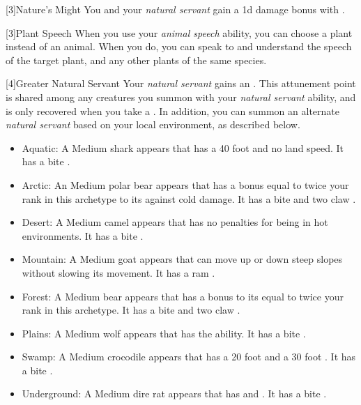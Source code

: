         [3]{Nature's Might} You and your \textit{natural servant} gain a \plus1d damage bonus with .

        [3]{Plant Speech} When you use your \textit{animal speech} ability, you can choose a plant instead of an animal.
        When you do, you can speak to and understand the speech of the target plant, and any other plants of the same species.

        [4]{Greater Natural Servant} Your \textit{natural servant} gains an .
        This attunement point is shared among any creatures you summon with your \textit{natural servant} ability, and is only recovered when you take a .
        In addition, you can summon an alternate \textit{natural servant} based on your local environment, as described below.
        \begin{itemize}
            \item Aquatic: A Medium shark appears that has a 40 foot  and no land speed.
                It has a bite .
            \item Arctic: An Medium polar bear appears that has a bonus equal to twice your rank in this archetype to its  against cold damage.
                It has a bite  and two claw .
            \item Desert: A Medium camel appears that has no penalties for being in hot environments.
                It has a bite .
            \item Mountain: A Medium goat appears that can move up or down steep slopes without slowing its movement.
                It has a ram .
            \item Forest: A Medium bear appears that has a bonus to its  equal to twice your rank in this archetype.
                It has a bite  and two claw .
            \item Plains: A Medium wolf appears that has the  ability.
                It has a bite .
            \item Swamp: A Medium crocodile appears that has a 20 foot  and a 30 foot .
                It has a bite .
            \item Underground: A Medium dire rat appears that has  and .
                It has a bite .
        \end{itemize}

